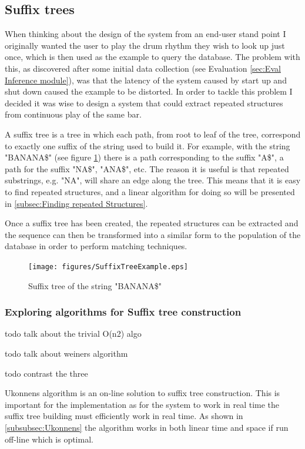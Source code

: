 \documentclass[12pt,twoside,notitlepage]{report}
\begin{document}
		\subsection{\label{subsec:PrepSuffix}Suffix trees}
		
		When thinking about the design of the system from an end-user stand point I originally wanted the user to play the drum rhythm they wish to look up just once, which is then used as the example to query the database. The problem with this, as discovered after some initial data collection (see Evaluation \ref{sec:Eval Inference module}), was that the latency of the system caused by start up and shut down caused the example to be distorted. In order to tackle this problem I decided it was wise to design a system that could extract repeated structures from continuous play of the same bar.
		
		A suffix tree\cite{Weiner1973} is a tree in which each path, from root to leaf of the tree, correspond to exactly one suffix of the string used to build it. For example, with the string "BANANA\$" (see figure \ref{SuffixTree}) there is a path corresponding to the suffix "A\$", a path for the suffix "NA\$", "ANA\$", etc. The reason it is useful is that repeated substrings, e.g. "NA", will share an edge along the tree. This means that it is easy to find repeated structures, and a linear algorithm\cite{Ukonnen1995} for doing so will be presented in \ref{subsec:Finding repeated Structures}.	
		
		Once a suffix tree has been created, the repeated structures can be extracted and the sequence can then be transformed into a similar form to the population of the database in order to perform matching techniques.
\begin{figure}[h]
			\centerline{\texttt{[image: figures/SuffixTreeExample.eps]}}
			\caption{\label{SuffixTree} Suffix tree of the string "BANANA\$"}
\end{figure}
		
			\subsubsection{Exploring algorithms for Suffix tree construction}
			todo talk about the trivial O(n2) algo
			
			todo talk about weiners algorithm

			todo contrast the three

			Ukonnens algorithm\cite{Ukkonen1995} is an on-line solution to suffix tree construction. This is important for the implementation as for the system to work in real time the suffix tree building must efficiently work in real time. As shown in \ref{subsubsec:Ukonnens} the algorithm works in both linear time and space if run off-line which is optimal.
\end{document}
